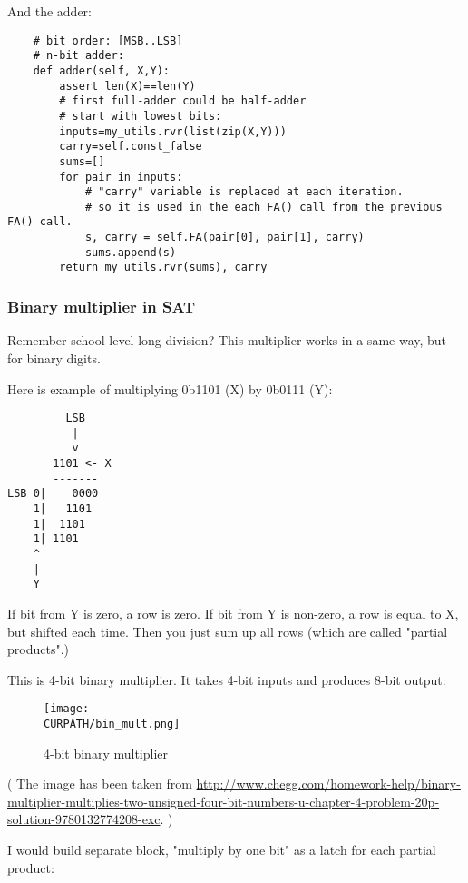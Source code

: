 And the adder:

\begin{lstlisting}
    # bit order: [MSB..LSB]
    # n-bit adder:
    def adder(self, X,Y):
        assert len(X)==len(Y)
        # first full-adder could be half-adder
        # start with lowest bits:
        inputs=my_utils.rvr(list(zip(X,Y)))
        carry=self.const_false
        sums=[]
        for pair in inputs:
            # "carry" variable is replaced at each iteration.
            # so it is used in the each FA() call from the previous FA() call.
            s, carry = self.FA(pair[0], pair[1], carry)
            sums.append(s)
        return my_utils.rvr(sums), carry
\end{lstlisting}

\subsubsection{Binary multiplier in SAT}

Remember school-level long division?
This multiplier works in a same way, but for binary digits.

Here is example of multiplying 0b1101 (X) by 0b0111 (Y):

\begin{lstlisting}
         LSB
          |
          v
       1101 <- X
       -------
LSB 0|    0000
    1|   1101
    1|  1101
    1| 1101
    ^
    |
    Y
\end{lstlisting}

If bit from Y is zero, a row is zero.
If bit from Y is non-zero, a row is equal to X, but shifted each time.
Then you just sum up all rows (which are called "partial products".)

This is 4-bit binary multiplier. It takes 4-bit inputs and produces 8-bit output:

\begin{figure}[H]
\centering
\texttt{[image: \\CURPATH/bin\_mult.png]}
\caption{4-bit binary multiplier}
\end{figure}

( The image has been taken from \url{http://www.chegg.com/homework-help/binary-multiplier-multiplies-two-unsigned-four-bit-numbers-u-chapter-4-problem-20p-solution-9780132774208-exc}. )

I would build separate block, "multiply by one bit" as a latch for each partial product:

